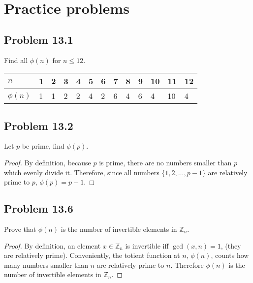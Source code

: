 \documentclass[12pt]{article}
\title{\scalebox{2}{Math 341 Homework 13}}
\author{\scalebox{1.5}{Theo Koss}}
\date{December 2020}
\newcommand{\Z}{\mathbb{Z}}
\begin{document}
\maketitle
\section{Practice problems}
\subsection{Problem 13.1}
Find all $\phi(n)$ for $n\leq12$.\begin{landscape}
\begin{table}[h]
\begin{tabular}{|l|l|l|l|l|l|l|l|l|l|l|l|l|}
\hline
$n$       & 1 & 2 & 3 & 4 & 5 & 6 & 7 & 8 & 9 & 10 & 11 & 12 \\ \hline
$\phi(n)$ & 1 & 1 & 2 & 2 & 4 & 2 & 6 & 4 & 6 & 4  & 10 & 4  \\ \hline
\end{tabular}
\end{table}
\end{landscape}
\subsection{Problem 13.2}
Let $p$ be prime, find $\phi(p)$.
\begin{proof}
By definition, because $p$ is prime, there are no numbers smaller than $p$ which evenly divide it. Therefore, since all numbers $\{1,2,\dots,p-1\}$ are relatively prime to $p$, $\phi(p)=p-1$.
\end{proof}
\subsection{Problem 13.6}
Prove that $\phi(n)$ is the number of invertible elements in $\Z_{n}$.
\begin{proof}
By definition, an element $x\in\Z_n$ is invertible iff $\gcd(x,n)=1$, (they are relatively prime). Conveniently, the totient function at $n$, $\phi(n)$, counts how many numbers smaller than $n$ are relatively prime to $n$. Therefore $\phi(n)$ is the number of invertible elements in $\Z_n$.
\end{proof}
\end{document}
